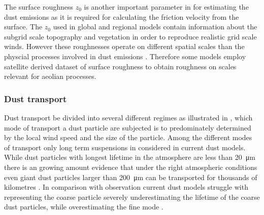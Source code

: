 The surface roughness $z_0$ is another important parameter in for estimating the dust emissions as it is required for calculating the friction velocity from the surface. The $z_0$ used in global and regional models contain information about the subgrid scale topography and vegetation in order to reproduce realistic grid scale winds. However these roughnesses operate on different spatial scales than the physcial processes involved in dust emissions \parencite{darmenova_development_2009}. Therefore some models employ satellite derived dataset of surface roughness to obtain roughness on scales relevant for aeolian processes. 



\subsubsection{Dust transport}
Dust transport be divided into several different regimes as illustrated in , which mode of transport a dust particle are subjected is to predominately determined by the local wind speed  and the size of the particle. Among the different modes of transport only long term suspensions in considered in current dust models. While dust particles with longest lifetime in the atmosphere are less than \SI{20}{\micro\metre} there is an growing amount evidence that under the right atmospheric conditions even giant dust particles larger than \SI{200}{\micro\metre} can be transported for thousands of kilometres \parencite{van2018mysterious}. In comparison with observation current dust models struggle with representing the coarse particle severely underestimating the lifetime of the coarse dust particles, while overestimating the fine mode \parencite{adebiyi2020dust}. 

